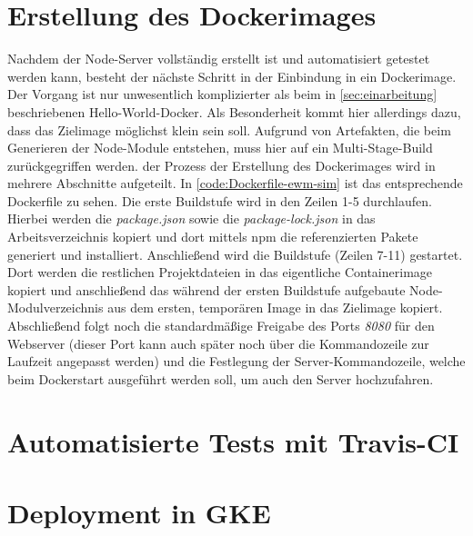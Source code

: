 \section{Erstellung des Dockerimages}
Nachdem der Node-Server vollständig erstellt ist und automatisiert getestet werden kann, besteht der nächste Schritt in der Einbindung in ein Dockerimage.
Der Vorgang ist nur unwesentlich komplizierter als beim in \autoref{sec:einarbeitung} beschriebenen Hello-World-Docker.
Als Besonderheit kommt hier allerdings dazu, dass das Zielimage möglichst klein sein soll.
Aufgrund von Artefakten, die beim Generieren der Node-Module entstehen, muss hier auf ein Multi-Stage-Build zurückgegriffen werden.
\Dash der Prozess der Erstellung des Dockerimages wird in mehrere Abschnitte aufgeteilt.
In \autoref{code:Dockerfile-ewm-sim} ist das entsprechende Dockerfile zu sehen.
Die erste Buildstufe wird in den Zeilen 1-5 durchlaufen.
Hierbei werden die \emph{package.json} sowie die \emph{package-lock.json} in das Arbeitsverzeichnis kopiert und dort mittels \ac{npm} die referenzierten Pakete generiert und installiert.
Anschließend wird die Buildstufe (Zeilen 7-11) gestartet.
Dort werden die restlichen Projektdateien in das eigentliche Containerimage kopiert und anschließend das während der ersten Buildstufe aufgebaute Node-Modulverzeichnis aus dem ersten, temporären Image in das Zielimage kopiert.
Abschließend folgt noch die standardmäßige Freigabe des Ports \emph{8080} für den Webserver (dieser Port kann auch später noch über die Kommandozeile zur Laufzeit angepasst werden) und die Festlegung der Server-Kommandozeile, welche beim Dockerstart ausgeführt werden soll, um auch den Server hochzufahren.




\section{Automatisierte Tests mit Travis-CI}


\section{Deployment in \ac{GKE}}
